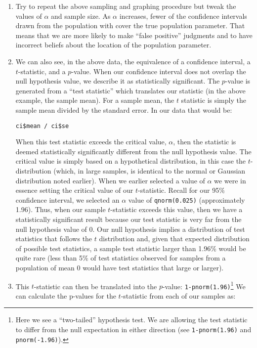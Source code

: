 \documentclass[a4paper,12pt]{article}
\begin{document}
\begin{enumerate}
\item Try to repeat the above sampling and graphing procedure but tweak the values of $\alpha$ and sample size. As $\alpha$ increases, fewer of the confidence intervals drawn from the population with cover the true population parameter. That means that we are more likely to make ``false positive'' judgments and to have incorrect beliefs about the location of the population parameter.

\item We can also see, in the above data, the equivalence of a confidence interval, a $t$-statistic, and a $p$-value. When our confidence interval does not overlap the null hypothesis value, we describe it as statistically significant. The $p$-value is generated from a ``test statistic'' which translates our statistic (in the above example, the sample mean). For a sample mean, the $t$ statistic is simply the sample mean divided by the standard error. In our data that would be:

\begin{verbatim}
ci$mean / ci$se
\end{verbatim}

\noindent When this test statistic exceeds the critical value, $\alpha$, then the statistic is deemed statistically significantly different from the null hypothesis value. The critical value is simply based on a hypothetical distribution, in this case the $t$-distribution (which, in large samples, is identical to the normal or Gaussian distribution noted earlier). When we earlier selected a value of $\alpha$ we were in essence setting the critical value of our $t$-statistic. Recall for our 95\% confidence interval, we selected an $\alpha$ value of \texttt{qnorm(0.025)} (approximately 1.96). Thus, when our sample $t$-statistic exceeds this value, then we have a statistically significant result because our test statistic is very far from the null hypothesis value of 0. Our null hypothesis implies a distribution of test statistics that follows the $t$ distribution and, given that expected distribution of possible test statistics, a sample test statistic larger than 1.96\% would be quite rare (less than 5\% of test statistics observed for samples from a population of mean 0 would have test statistics that large or larger).

\item This $t$-statistic can then be translated into the $p$-value: \texttt{1-pnorm(1.96)}\footnote{Here we see a ``two-tailed'' hypothesis test. We are allowing the test statistic to differ from the null expectation in either direction (see \texttt{1-pnorm(1.96)} and \texttt{pnorm(-1.96)}).} We can calculate the p-values for the $t$-statistic from each of our samples as:


\end{enumerate}
\end{document}
